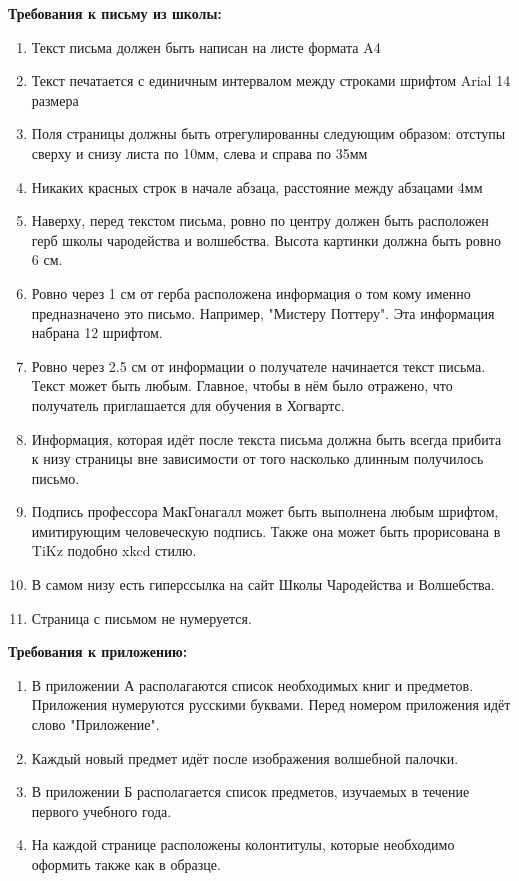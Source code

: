 \documentclass[12pt, a4paper, oneside]{article}
\begin{document}
\textbf{Требования к письму из школы:}
\begin{enumerate}
\item Текст письма должен быть написан на листе формата A4
\item Текст печатается с единичным интервалом между строками шрифтом Arial 14 размера
\item Поля страницы должны быть отрегулированны следующим образом: отступы сверху и снизу листа по 10мм, слева и справа по 35мм
\item Никаких красных строк в начале абзаца, расстояние между абзацами 4мм
\item  Наверху, перед текстом письма, ровно по центру должен быть расположен герб школы чародейства и волшебства. Высота картинки должна быть ровно 6 см.
\item  Ровно через 1 см от герба расположена информация о том кому именно предназначено это письмо. Например, "Мистеру Поттеру". Эта информация набрана 12 шрифтом.
\item  Ровно через 2.5 см от информации о получателе начинается текст письма. Текст может быть любым. Главное, чтобы в нём было отражено, что получатель приглашается для обучения в Хогвартс.
\item  Информация, которая идёт после текста письма должна быть всегда прибита к низу страницы вне зависимости от того насколько длинным получилось письмо.
\item Подпись профессора МакГонагалл может быть выполнена любым шрифтом, имитирующим человеческую подпись. Также она может быть прорисована в TiKz подобно xkcd стилю.
\item  В самом низу есть гиперссылка на сайт Школы Чародейства и Волшебства.
\item Страница с письмом не нумеруется.
\end{enumerate}


\textbf{Требования к приложению:}
\begin{enumerate}[resume]
\item  В приложении А располагаются список необходимых книг и предметов.  Приложения нумеруются русскими буквами. Перед номером приложения идёт слово "Приложение".
\item  Каждый новый предмет идёт после изображения волшебной палочки.
\item  В приложении Б располагается список предметов, изучаемых в течение первого учебного года.
\item  На каждой странице расположены колонтитулы, которые необходимо оформить также как в образце.
\end{enumerate}
\end{document}
